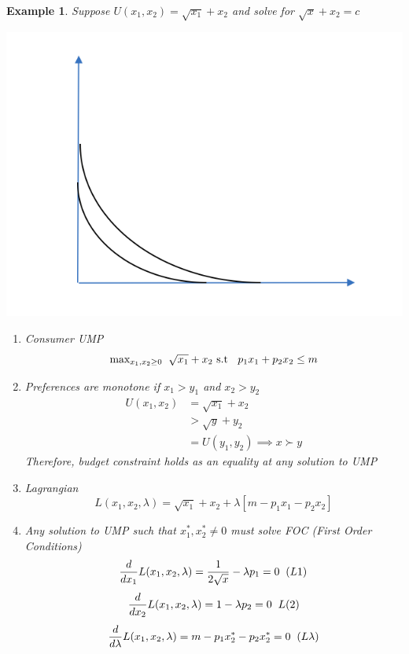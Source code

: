 \documentclass[twoside]{article}
\newtheorem{ex}[theorem]{Example}
\begin{document}
\begin{ex} Suppose \(U(x_1, x_2) = \sqrt{x_1} + x_2\) and solve for \(\sqrt{x} + x_2 = c\)
\begin{center}
\includegraphics[scale=0.4]{10}
\end{center}
\begin{enumerate}
\item Consumer UMP 
\[\text{max}_{x_1, x_2 \geq 0} \hspace{0.2cm} \sqrt{x_1} + x_2  \text{ s.t } \hspace{0.2cm} p_1 x_1 + p_2x_2  \leq m \]
\item Preferences are monotone if \(x_1 > y_1\) and \(x_2 > y_2\) 
\[\begin{aligned}
U(x_1, x_2) & = \sqrt{x_1} + x_2 \\
&  > \sqrt{y} + y_2 \\
& = U(y_1, y_2) \implies x \succ y 
\end{aligned}\]
Therefore, budget constraint holds as an equality at any solution to UMP 
\item Lagrangian
\[L(x_1, x_2, \lambda) = \sqrt{x_1} + x_2 + \lambda [ m - p_1 x_1 - p_2 x_2 ]\]
\item Any solution to UMP such that \(x_1^* , x_2^* \neq 0\) must solve FOC (First Order Conditions) 
\[ \frac{d}{dx_1 } L(x_1, x_2, \lambda) = \frac{1}{2 \sqrt{x}} - \lambda p_1 = 0 \hspace{0.2cm} (L1) \]
\[\frac{d}{dx_2} L(x_1, x_2, \lambda)  = 1 - \lambda p_2 = 0 \hspace{0.2cm} L(2)\]
\[\frac{d}{d\lambda} L(x_1, x_2, \lambda)  = m - p_1 x_2^* - p_2x_2^* = 0 \hspace*{0.2cm} (L\lambda)\]

\end{enumerate}
\end{ex}
\end{document}

